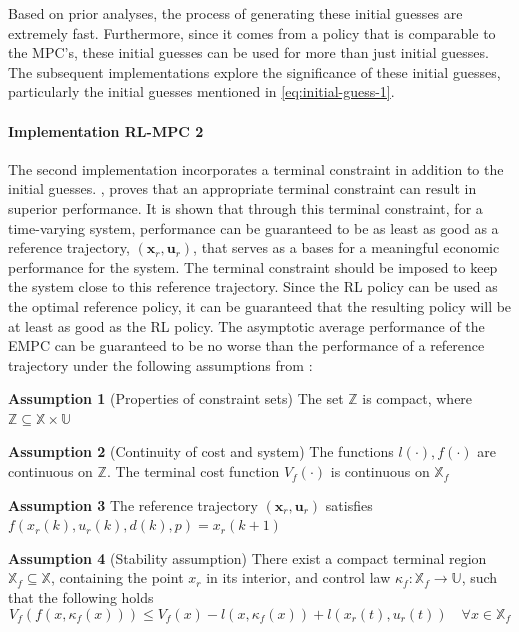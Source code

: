 Based on prior analyses, the process of generating these initial guesses are extremely fast. Furthermore, since it comes from a policy that is comparable to the MPC's, these initial guesses can be used for more than just initial guesses. The subsequent implementations explore the significance of these initial guesses,  particularly the initial guesses mentioned in \autoref{eq:initial-guess-1}.

\paragraph{Implementation RL-MPC 2}
The second implementation incorporates a terminal constraint in addition to the initial guesses. \cite{risbeckEconomicModelPredictive2020}, \cite{amritEconomicOptimizationUsing2011} proves that an appropriate terminal constraint can result in superior performance. It is shown that through this terminal constraint, for a time-varying system, performance can be guaranteed to be as least as good as a reference trajectory, $(\mathbf{x}_r, \mathbf{u}_r)$,  that serves as a bases for a meaningful economic performance for the system. The terminal constraint should be imposed to keep the system close to this reference trajectory. Since the RL policy can be used as the optimal reference policy, it can be guaranteed that the resulting policy will be at least as good as the RL policy.  The asymptotic average performance of the EMPC can be guaranteed to be no worse than the performance of a reference trajectory under the following assumptions from \cite{amritEconomicOptimizationUsing2011,risbeckEconomicModelPredictive2020}:

\hspace{1cm} \textbf{Assumption 1} (Properties of constraint sets) The set $\mathbb{Z}$ is compact, where $\mathbb{Z} \subseteq \mathbb{X} \times \mathbb{U}$

\hspace{1cm} \textbf{Assumption 2}  (Continuity of cost and system) The functions $l(\cdot), f(\cdot)$ are continuous on $\mathbb{Z}$. The terminal cost function $V_f(\cdot)$ is continuous on $\mathbb{X}_f$ 

\hspace{1cm} \textbf{Assumption 3}  The reference trajectory $(\mathbf{x}_r, \mathbf{u}_r)$ satisfies $f(x_r(k),u_r(k),d(k),p)=x_r(k+1)$

\hspace{1cm} \textbf{Assumption 4} (Stability assumption) There exist a compact terminal region $\mathbb{X}_f \subseteq \mathbb{X}$, containing the point $x_r$ in its interior, and control law $\kappa_f : \mathbb{X}_f \rightarrow \mathbb{U}$, such that the following holds 
\begin{equation}\label{eq:assumption_3}
	V_f(f(x,\kappa_f(x))) \leq V_f(x) - l(x,\kappa_f(x)) + l(x_r(t),u_r(t)) \quad \forall x \in \mathbb{X}_f
\end{equation}

